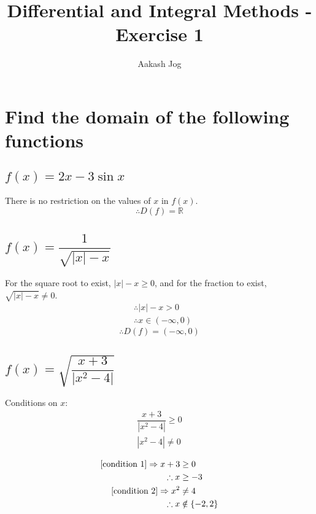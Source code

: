 \documentclass[fleqn, a4paper, 10pt]{article}
\title{Differential and Integral Methods - Exercise 1}
\author{Aakash Jog}
\date{\formatdate{5}{11}{2014}}
\begin{document}
	
\maketitle
\setlength{\mathindent}{0pt}


\section{Find the domain of the following functions}

\subsection{$f(x) = 2 x - 3 \sin x$}

There is no restriction on the values of $x$ in $f(x)$.\\
\begin{equation*}
	\boxed{	\therefore D(f) = \mathbb{R}}
\end{equation*}

\subsection{$f(x) = \dfrac{1}{\sqrt{|x| - x}}$}

For the square root to exist, $|x| - x \geq 0$, and for the fraction to exist, $\sqrt{|x| - x} \neq 0$.
\begin{align*}
	&\therefore |x| - x > 0\\
	&\therefore x \in (-\infty, 0)
\end{align*}
\begin{equation*}
	\boxed{	\therefore D(f) = (-\infty, 0)}
\end{equation*}

\subsection{$f(x) = \sqrt{\dfrac{x + 3}{|x^2 - 4|}}$}

Conditions on $x$:
\begin{align}
	\dfrac{x + 3}{|x^2 - 4|} \geq 0 \label{condition 1}\\ 
	|x^2 - 4| \neq 0 \label{condition 2}
\end{align}

\begin{align*}
	\eqref{condition 1} \Rightarrow x + 3 &\geq 0\\
	\therefore x &\geq -3 \\
	\eqref{condition 2} \Rightarrow x^2 &\neq 4 \\
	\therefore x &\notin \{-2,2\}
\end{align*}
\end{document}
